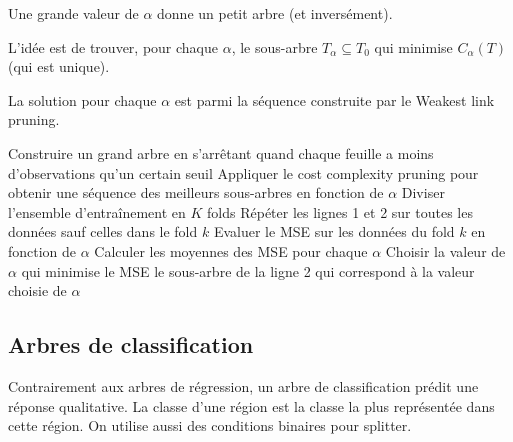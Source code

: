             Une grande valeur de \(\alpha\) donne un petit arbre (et inversément).

            L'idée est de trouver, pour chaque \(\alpha\), le sous-arbre \(T_\alpha \subseteq T_0\) qui minimise \(C_\alpha(T)\) (qui est unique).

            \begin{remarque}
                La solution pour chaque \(\alpha\) est parmi la séquence construite par le Weakest link pruning.
            \end{remarque}

            \begin{algorithm}
                \begin{algorithmic}[1]
                    \State Construire un grand arbre en s'arrêtant quand chaque feuille a moins d'observations qu'un certain seuil
                    \State Appliquer le cost complexity pruning pour obtenir une séquence des meilleurs sous-arbres en fonction de \(\alpha\)
                    \State Diviser l'ensemble d'entraînement en \(K\) folds
                        \State Répéter les lignes 1 et 2 sur toutes les données sauf celles dans le fold \(k\)
                        \State Evaluer le MSE sur les données du fold \(k\) en fonction de \(\alpha\)
                    \EndFor
                    \State Calculer les moyennes des MSE pour chaque \(\alpha\)
                    \State Choisir la valeur de \(\alpha\) qui minimise le MSE
                    \State \Return le sous-arbre de la ligne 2 qui correspond à la valeur choisie de \(\alpha\)
                \end{algorithmic}
            \end{algorithm}

    \subsection{Arbres de classification}
        Contrairement aux arbres de régression, un arbre de classification prédit une réponse qualitative. La classe d'une région est la classe la plus représentée dans cette région. On utilise aussi des conditions binaires pour splitter.

